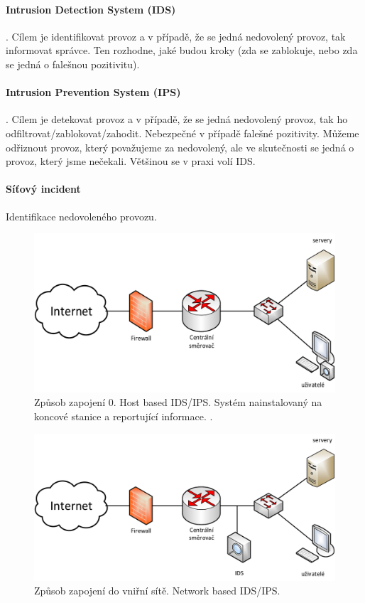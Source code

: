 \paragraph*{Intrusion Detection System (IDS)} . Cílem je identifikovat provoz a v případě, že se jedná nedovolený provoz, tak informovat správce. Ten rozhodne, jaké budou kroky (zda se zablokuje, nebo zda se jedná o falešnou pozitivitu).

\paragraph*{Intrusion Prevention System (IPS)} . Cílem je detekovat provoz a v případě, že se jedná nedovolený provoz, tak ho odfiltrovat/zablokovat/zahodit. Nebezpečné v případě falešné pozitivity. Můžeme odřiznout provoz, který považujeme za nedovolený, ale ve skutečnosti se jedná o provoz, který jsme nečekali. Většinou se v praxi volí IDS.

\paragraph*{Síťový incident} Identifikace nedovoleného provozu.

\begin{figure}[H]
    \centering
    \includegraphics[width=0.75\linewidth]{zpusob_zapojeni_0.png}
    \caption{Způsob zapojení 0. Host based IDS/IPS. Systém nainstalovaný na koncové stanice a reportující informace. .}
\end{figure}

\begin{figure}[H]
    \centering
    \includegraphics[width=0.75\linewidth]{zpusob_zapojeni_1.png}
    \caption{Způsob zapojení do vniřní sítě. Network based IDS/IPS.}
\end{figure}

